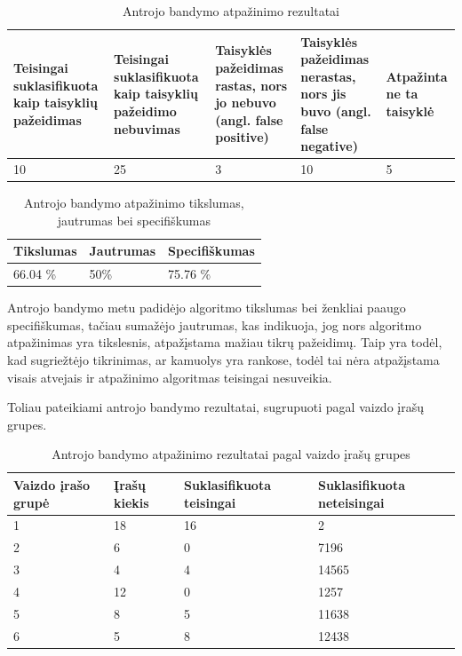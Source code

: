\documentclass{VUMIFPSbakalaurinis}
\begin{document}
\begin{table}[H]\footnotesize
	\centering
	\caption{Antrojo bandymo atpažinimo rezultatai}
	{\begin{tabular}{|p{3cm}|p{3cm}|p{3cm}|p{3cm}|p{2cm}|} \hline
			\textbf{Teisingai suklasifikuota kaip taisyklių pažeidimas} & \textbf{Teisingai suklasifikuota kaip taisyklių pažeidimo nebuvimas} & \textbf{Taisyklės pažeidimas rastas, nors jo nebuvo (angl. false positive)} & \textbf{Taisyklės pažeidimas nerastas, nors jis buvo (angl. false negative)} & \textbf{Atpažinta ne ta taisyklė} \\
			\hline
			10  & 25    & 3    & 10    & 5   \\
			\hline
	\end{tabular}}
	\label{tab:second_trial}
\end{table}

\begin{table}[H]\footnotesize
	\centering
	\caption{Antrojo bandymo atpažinimo tikslumas, jautrumas bei specifiškumas}
	{\begin{tabular}{|p{5cm}|p{5cm}|p{5cm}|} \hline
			\textbf{Tikslumas} & \textbf{Jautrumas} & \textbf{Specifiškumas} \\
			\hline
			66.04 \%  & 50\%    & 75.76 \%    \\
			
			\hline
	\end{tabular}}
	\label{tab:second_trial_percents}
\end{table}

Antrojo bandymo metu padidėjo algoritmo tikslumas bei ženkliai paaugo specifiškumas, tačiau sumažėjo jautrumas, kas indikuoja, jog nors algoritmo atpažinimas yra tikslesnis, atpažįstama mažiau tikrų pažeidimų. Taip yra todėl, kad sugriežtėjo tikrinimas, ar kamuolys yra rankose, todėl tai nėra atpažįstama visais atvejais ir atpažinimo algoritmas teisingai nesuveikia. 

Toliau pateikiami antrojo bandymo rezultatai, sugrupuoti pagal vaizdo įrašų grupes.

\begin{table}[H]\footnotesize
	\centering
	\caption{Antrojo bandymo atpažinimo rezultatai pagal vaizdo įrašų grupes}
	{\begin{tabular}{|p{3cm}|p{3cm}|p{3cm}|p{3cm}|} \hline
			\textbf{Vaizdo įrašo grupė} & \textbf{Įrašų kiekis} & \textbf{Suklasifikuota teisingai} & \textbf{Suklasifikuota neteisingai} \\
			\hline
			1  & 18    & 16    & 2    \\
			\hline
			2  & 6    & 0  & 7196     \\
			\hline
			3  & 4    & 4   & 14565    \\
			\hline
			4  & 12    & 0  & 1257     \\
			\hline
			5  & 8    & 5  & 11638     \\
			\hline
			6  & 5    & 8  & 12438     \\
			\hline
	\end{tabular}}
	\label{tab:recognizion_results_grouped}
\end{table}
\end{document}
